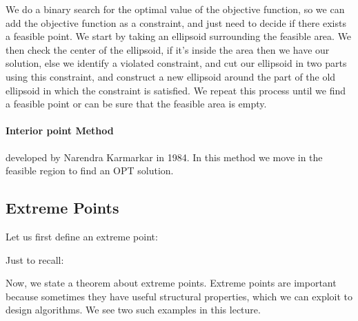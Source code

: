 We do a binary search for the optimal value of the objective function, so we can add the objective
function as a constraint, and just need to decide if there exists a feasible point. We start by
taking an ellipsoid surrounding the feasible area. We then check the center of the ellipsoid, if
it's inside the area then we have our solution, else we identify a violated constraint, and cut
our ellipsoid in two parts using this constraint, and construct a new ellipsoid around the part
of the old ellipsoid in which the constraint is satisfied. We repeat this process until we find a
feasible point or can be sure that the feasible area is empty.

\paragraph{Interior point Method} developed by Narendra Karmarkar in 1984. In this method we move
in the feasible region to find an OPT solution.

\subsection{Extreme Points}

Let us first define an extreme point:


Just to recall:


Now, we state a theorem about extreme points. Extreme points are important because sometimes they
have useful structural properties, which we can exploit to design algorithms. We see two such
examples in this lecture.

\label{thm:extreme}


